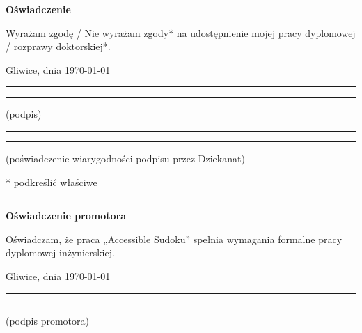 \documentclass[a4paper,twoside,12pt]{book}
\newcommand{\Title}{Accessible Sudoku}
\begin{document}
\begin{center}
\Large\bfseries Oświadczenie
\end{center}

\vfill

Wyrażam  zgodę / Nie wyrażam zgody*  na  udostępnienie  mojej  pracy  dyplomowej / rozprawy doktorskiej*.

\vfill

Gliwice, dnia {\today}

\vfill

\rule{0.5\textwidth}{0cm}\dotfill 

\rule{0.5\textwidth}{0cm}
\begin{minipage}{0.45\textwidth}
{\begin{center}(podpis)\end{center}}
\end{minipage} 

\vfill

\rule{0.5\textwidth}{0cm}\dotfill 

\rule{0.5\textwidth}{0cm}
\begin{minipage}{0.45\textwidth}
{\begin{center}\rule{0mm}{5mm}(poświadczenie wiarygodności podpisu przez Dziekanat)\end{center}}
\end{minipage}


\vfill

* podkreślić właściwe

 


\cleardoublepage

\rule{1cm}{0cm}

\vfill  

\begin{center}
\Large\bfseries Oświadczenie promotora
\end{center}

\vfill

Oświadczam, że praca „\Title” spełnia wymagania formalne pracy dyplomowej inżynierskiej.

\vfill



\vfill

Gliwice, dnia {\today}

\rule{0.5\textwidth}{0cm}\dotfill 

\rule{0.5\textwidth}{0cm}
\begin{minipage}{0.45\textwidth}
{\begin{center}(podpis promotora)\end{center}}
\end{minipage} 
\end{document}
